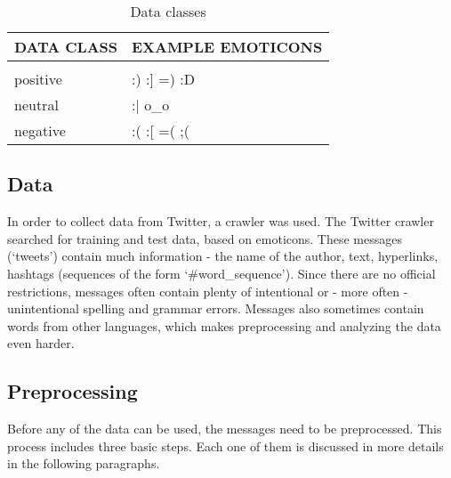 \documentclass{article} %
\begin{document}
\begin{table}[h!]
\caption{Data classes}
\label{tab:classes}
\begin{center}
\begin{tabular}{ll}
\multicolumn{1}{l}{\bf DATA CLASS}  &\multicolumn{1}{l}{\bf EXAMPLE EMOTICONS}
\\ \hline \\
positive 			& :) \: \:  			:] \: \: 		=) \: \: 		:D  	\\
neutral 				& :$\vert$ \: \: 	o\_o  								\\
negative 			& :( \: \: 			:[ \: \: 		=( \: \: 		;( 		\\
\end{tabular}{}
\end{center}
\end{table}

\subsection{Data}

In order to collect data from Twitter, a crawler was used. The Twitter crawler searched for training and test data, based on emoticons. These messages (`tweets') contain much information - the name of the author, text, hyperlinks, hashtags (sequences of the form `\#word\_sequence'). Since there are no official restrictions, messages often contain plenty of intentional or - more often - unintentional spelling and grammar errors. Messages also sometimes contain words from other languages, which makes preprocessing and analyzing the data even harder.


\subsection{Preprocessing \label{sec:preprocessing}}

Before any of the data can be used, the messages need to be preprocessed. This process includes three basic steps. Each one of them is discussed in more details in the following paragraphs.



\begin{comment}
\begin{itemize}
\item \textbf{Splitting the message} into different components - text, hashtags and emoticons.
\item \textbf{Spelling check and correction} 
\item \textbf{Grammar check and correction} 
\end{itemize}
\end{comment}
\end{document}

